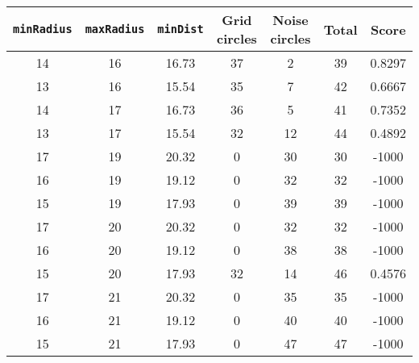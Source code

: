 \documentclass[letterpaper, 12pt]{article}
\begin{document}
\begin{longtable}{|c|c|c|c|c|c|c|}
\hline
\textbf{\texttt{minRadius}} & \textbf{\texttt{maxRadius}} & \textbf{\texttt{minDist}} & \textbf{Grid circles} & \textbf{Noise circles} & \textbf{Total} & \textbf{Score} \\
\hline
14 & 16 & 16.73 & 37 & 2 & 39 & 0.8297 \\
\hline
13 & 16 & 15.54 & 35 & 7 & 42 & 0.6667 \\
\hline
14 & 17 & 16.73 & 36 & 5 & 41 & 0.7352 \\
\hline
13 & 17 & 15.54 & 32 & 12 & 44 & 0.4892 \\
\hline
17 & 19 & 20.32 & 0 & 30 & 30 & -1000 \\
\hline
16 & 19 & 19.12 & 0 & 32 & 32 & -1000 \\
\hline
15 & 19 & 17.93 & 0 & 39 & 39 & -1000 \\
\hline
17 & 20 & 20.32 & 0 & 32 & 32 & -1000 \\
\hline
16 & 20 & 19.12 & 0 & 38 & 38 & -1000 \\
\hline
15 & 20 & 17.93 & 32 & 14 & 46 & 0.4576 \\
\hline
17 & 21 & 20.32 & 0 & 35 & 35 & -1000 \\
\hline
16 & 21 & 19.12 & 0 & 40 & 40 & -1000 \\
\hline
15 & 21 & 17.93 & 0 & 47 & 47 & -1000 \\
\hline
\end{longtable}
\end{document}
